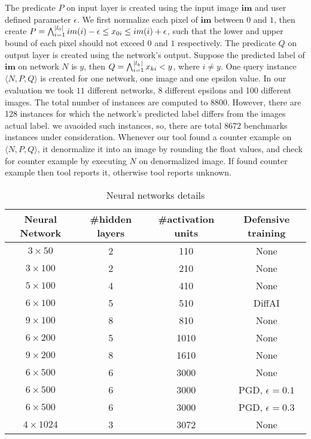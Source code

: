 The predicate $P$ on input layer is created using the input image $\boldsymbol{im}$ and user defined parameter $\epsilon$. 
We first normalize each pixel of $\boldsymbol{im}$ between $0$ and $1$, then create 
$P = \bigwedge_{i=1}^{|l_0|} im(i)-\epsilon \leq x_{0i}\leq im(i)+\epsilon$, such that the lower and upper bound of each pixel
should not exceed $0$ and $1$ respectively. The predicate $Q$ on output layer is created using the network's output.    
Suppose the predicted label of $\boldsymbol{im}$ on network $N$ is $y$, then $Q = \bigwedge_{i=1}^{|l_k|} x_{ki} < y$, where $i \neq y$. 
One query instance $\langle N,P,Q \rangle$ is created for one network, one image and one epsilon value. 
In our evaluation we took $11$ different networks, 8 different epsilons and 100 different images. The 
total number of instances are computed to $8800$. However, there are 128 instances for which the network's predicted
label differs from the images actual label. we avaoided such instances, so, there are total $8672$ benchmarks instances
under consideration.   
Whenever our tool found a counter example on $\langle N,P,Q \rangle$,
it denormalize it into an image by rounding the float values, 
and check for counter example by executing $N$ on denormalized image.
If found counter example then tool reports it, otherwise tool reports unknown.



\begin{table}
    \centering
    \begin{tabular}{c|c|c|c}
        \hline
        \textbf{Neural Network} & \textbf{\#hidden layers} & \textbf{\#activation units} & \textbf{Defensive training} \\
        \hline
        $3\times 50$ & 2 & 110 & None \\
        $3\times 100$ & 2 & 210 & None  \\
        $5\times 100$ & 4 & 410 & None  \\
        $6\times 100$ & 5 & 510 & DiffAI \\
        $9\times 100$ & 8 & 810 & None  \\
        $6\times 200$ & 5 & 1010 & None  \\
        $9\times 200$ & 8 & 1610 & None  \\
        $6\times 500$ & 6 & 3000 & None  \\
        $6\times 500$ & 6 & 3000 & PGD, $\epsilon = 0.1$ \\
        $6\times 500$ & 6 & 3000 & PGD, $\epsilon = 0.3$ \\
        $4\times 1024$ & 3 & 3072 & None  \\
        \hline
    \end{tabular}
    \caption{Neural networks details}
    \label{tb:nndetail}
\end{table}

